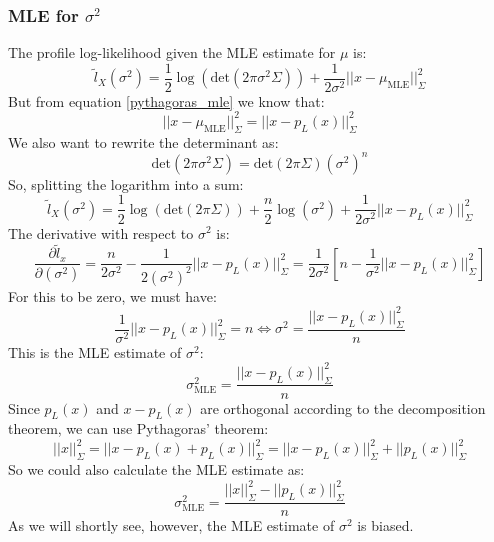 \documentclass[12pt, a4paper]{article}
\numberwithin{equation}{section}
\begin{document}
\subsubsection{MLE for $\sigma^2$}
The profile log-likelihood given the MLE estimate for $\mu$ is:
\begin{equation}
\tilde{l}_X(\sigma^2)=\frac{1}{2}\log\left(\textrm{det}(2\pi\sigma^2\Sigma)\right)+\frac{1}{2\sigma^2}||x-\mu_{\textrm{MLE}}||^2_\Sigma
\end{equation}
But from equation \ref{pythagoras_mle} we know that:
\begin{equation}
||x-\mu_{\textrm{MLE}}||^2_\Sigma=||x-p_L(x)||^2_\Sigma
\end{equation}
We also want to rewrite the determinant as:
\begin{equation}
\textrm{det}(2\pi\sigma^2\Sigma)=\textrm{det}(2\pi\Sigma)(\sigma^2)^n
\end{equation}
So, splitting the logarithm into a sum:
\begin{equation}
\tilde{l}_X(\sigma^2)=\frac{1}{2}\log\left(\textrm{det}(2\pi\Sigma)\right)+\frac{n}{2}\log(\sigma^2)+\frac{1}{2\sigma^2}||x-p_L(x)||^2_\Sigma
\end{equation}
The derivative with respect to $\sigma^2$ is:
\begin{equation}
\frac{\partial\tilde{l}_x}{\partial(\sigma^2)}=\frac{n}{2\sigma^2}-\frac{1}{2(\sigma^2)^2}||x-p_L(x)||^2_\Sigma=\frac{1}{2\sigma^2}\left[n-\frac{1}{\sigma^2}||x-p_L(x)||^2_\Sigma\right]
\end{equation}
For this to be zero, we must have:
\begin{equation}
\frac{1}{\sigma^2}||x-p_L(x)||^2_\Sigma=n\Leftrightarrow\sigma^2=\frac{||x-p_L(x)||^2_\Sigma}{n}
\end{equation}
This is the MLE estimate of $\sigma^2$:
\begin{equation}
\sigma^2_{\textrm{MLE}}=\frac{||x-p_L(x)||^2_\Sigma}{n}
\end{equation}
Since $p_L(x)$ and $x-p_L(x)$ are orthogonal according to the decomposition theorem, we can use Pythagoras' theorem:
\begin{equation}
||x||^2_\Sigma=||x-p_L(x)+p_L(x)||^2_\Sigma=||x-p_L(x)||^2_\Sigma+||p_L(x)||^2_\Sigma
\end{equation}
So we could also calculate the MLE estimate as:
\begin{equation}
\sigma^2_{\textrm{MLE}}=\frac{||x||^2_\Sigma-||p_L(x)||^2_\Sigma}{n}
\end{equation}
As we will shortly see, however, the MLE estimate of $\sigma^2$ is biased.
\end{document}
